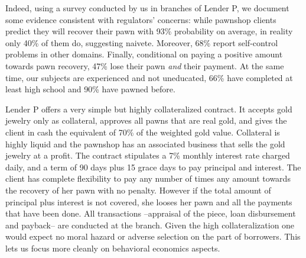 \documentclass[11pt]{article}
\begin{document}
Indeed, using a survey conducted by us in branches of Lender P, we document some evidence consistent with regulators' concerns: while pawnshop clients predict they will recover their pawn with 93\% probability on average, in reality only 40\% of them do, suggesting naivete. Moreover, 68\% report self-control problems in other domains. Finally, conditional on paying a positive amount towards pawn recovery, 47\% lose their pawn \textit{and} their payment.  %
At the same time, our subjects are experienced and not uneducated, 66\% have completed at least high school and 90\% have pawned before. %

Lender P offers a very simple but highly collateralized contract. It accepts gold jewelry only as collateral, approves all pawns that are real gold, and gives the client in cash the equivalent of 70\% of the weighted gold value. Collateral is highly liquid and the pawnshop has an associated business that sells the gold jewelry at a profit. The contract stipulates a 7\% monthly interest rate charged daily, and a term of 90 days plus 15 grace days to pay principal and interest. The client has complete flexibility to pay any number of times any amount towards the recovery of her pawn with no penalty. However if the total amount of principal plus interest is not covered, she looses her pawn and all the payments that have been done. All transactions --appraisal of the piece, loan disbursement and payback-- are conducted at the branch. Given the high collateralization one would expect no moral hazard or adverse selection on the part of borrowers. This lets us focus more cleanly on behavioral economics aspects.
\end{document}

